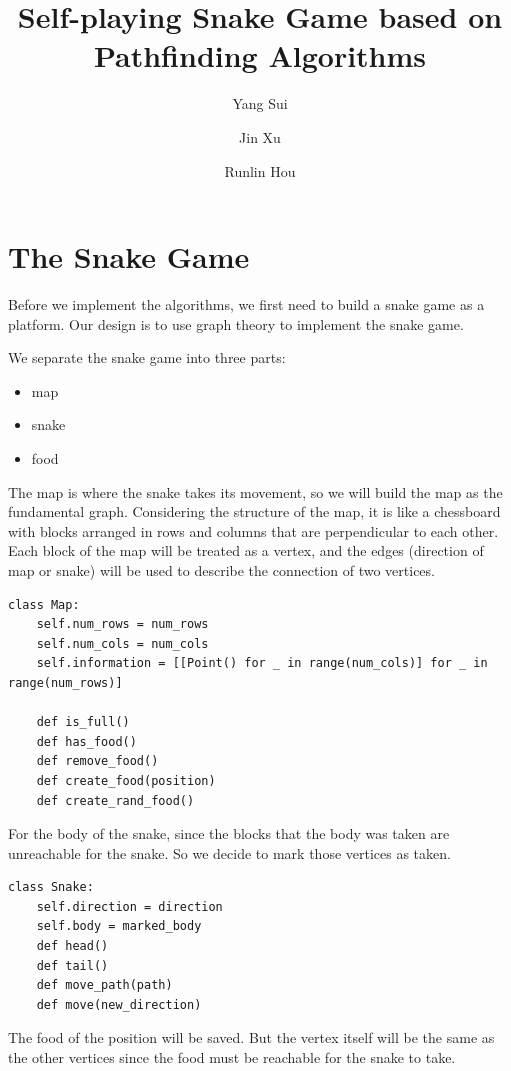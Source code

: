 \documentclass[12pt]{article}
\begin{document}
\title{\textbf{Self-playing Snake Game based on Pathfinding Algorithms}}
\author{Yang Sui \and Jin Xu \and Runlin Hou}

\maketitle

\section{The Snake Game}
Before we implement the algorithms, we first need to build a snake game as a platform. Our design is to use graph theory to implement the snake game. 

We separate the snake game into three parts:
\begin{itemize}
    \item map
    \item snake
    \item food
\end{itemize}

The map is where the snake takes its movement, so we will build the map as the fundamental graph. Considering the structure of the map, it is like a  chessboard with blocks arranged in rows and columns that are perpendicular to each other. Each block of the map will be treated as a vertex, and the edges (direction of map or snake) will be used to describe the connection of two vertices. 

\begin{lstlisting}
class Map:
    self.num_rows = num_rows
    self.num_cols = num_cols
    self.information = [[Point() for _ in range(num_cols)] for _ in range(num_rows)]

    def is_full()
    def has_food()
    def remove_food()
    def create_food(position)
    def create_rand_food()
\end{lstlisting}

For the body of the snake, since the blocks that the body was taken are unreachable for the snake. So we decide to mark those vertices as taken.
\begin{lstlisting}
class Snake:
    self.direction = direction
    self.body = marked_body
    def head()
    def tail()
    def move_path(path)
    def move(new_direction)
\end{lstlisting}

The food of the position will be saved. But the vertex itself will be the same as the other vertices since the food must be reachable for the snake to take.
\end{document}
